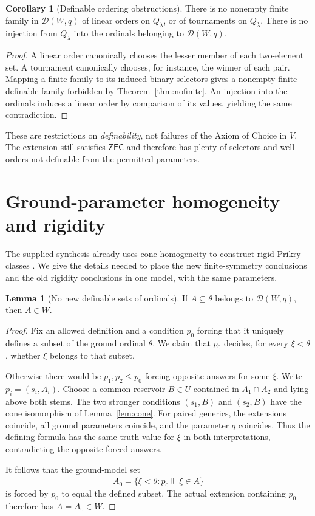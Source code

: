 \documentclass[11pt,letterpaper]{article}
\theoremstyle{definition}
\newtheorem{lemma}[definition]{Lemma}
\newtheorem{corollary}[definition]{Corollary}
\numberwithin{equation}{section}
\newcommand{\ZFC}{\mathsf{ZFC}}
\newcommand{\DD}{\mathscr D}
\newcommand{\pr}{\mathrel{\Vdash}}
\begin{document}
\begin{corollary}[Definable ordering obstructions]\label{cor:orders}
There is no nonempty finite family in $\DD(W,q)$ of linear orders on $Q_\lambda$, or of tournaments on $Q_\lambda$. There is no injection from $Q_\lambda$ into the ordinals belonging to $\DD(W,q)$.
\end{corollary}
\begin{proof}
A linear order canonically chooses the lesser member of each two-element set. A tournament canonically chooses, for instance, the winner of each pair. Mapping a finite family to its induced binary selectors gives a nonempty finite definable family forbidden by Theorem~\ref{thm:nofinite}. An injection into the ordinals induces a linear order by comparison of its values, yielding the same contradiction.
\end{proof}

These are restrictions on \emph{definability}, not failures of the Axiom of Choice in $V$. The extension still satisfies $\ZFC$ and therefore has plenty of selectors and well-orders not definable from the permitted parameters.

\section{Ground-parameter homogeneity and rigidity}\label{sec:rigidity}

The supplied synthesis already uses cone homogeneity to construct rigid Prikry classes \cite[section ``Exact consistency strengths'']{synthesis}. We give the details needed to place the new finite-symmetry conclusions and the old rigidity conclusions in one model, with the same parameters.

\begin{lemma}[No new definable sets of ordinals]\label{lem:noODord}
If $A\subseteq\theta$ belongs to $\DD(W,q)$, then $A\in W$.
\end{lemma}
\begin{proof}
Fix an allowed definition and a condition $p_0$ forcing that it uniquely defines a subset of the ground ordinal $\theta$. We claim that $p_0$ decides, for every $\xi<\theta$, whether $\xi$ belongs to that subset.

Otherwise there would be $p_1,p_2\leq p_0$ forcing opposite answers for some $\xi$. Write $p_i=(s_i,A_i)$. Choose a common reservoir $B\in U$ contained in $A_1\cap A_2$ and lying above both stems. The two stronger conditions $(s_1,B)$ and $(s_2,B)$ have the cone isomorphism of Lemma~\ref{lem:cone}. For paired generics, the extensions coincide, all ground parameters coincide, and the parameter $q$ coincides. Thus the defining formula has the same truth value for $\xi$ in both interpretations, contradicting the opposite forced answers.

It follows that the ground-model set
\[
 A_0=\{\xi<\theta:p_0\pr\xi\in\dot A\}
\]
is forced by $p_0$ to equal the defined subset. The actual extension containing $p_0$ therefore has $A=A_0\in W$.
\end{proof}
\end{document}
